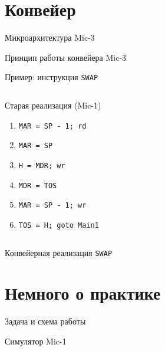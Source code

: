 \section{Конвейер}

\begin{frame}[plain]{Микроархитектура Mic-3}
\vspace{-.2cm}
\end{frame}

\begin{frame}[plain]{Принцип работы конвейера Mic-3}
\vspace{-.2cm}
\end{frame}

\begin{frame}{Пример: инструкция \texttt{SWAP}}
\pause
\begin{columns}
    \column{6cm}
\begin{block}{Старая реализация (Mic-1)}
\pause
    \begin{enumerate}
        \item \texttt{MAR = SP - 1; rd}
        \item \texttt{MAR = SP}
        \item \texttt{H = MDR; wr}
        \item \texttt{MDR = TOS}
        \item \texttt{MAR = SP - 1; wr}
        \item \texttt{TOS = H; goto Main1}
    \end{enumerate}
\end{block}
    \column{0cm}
\end{columns}
\end{frame}

\begin{frame}{Конвейерная реализация \texttt{SWAP}}
\end{frame}

\section{Немного о практике}

\begin{frame}{Задача и схема работы}
\end{frame}

\begin{frame}{Симулятор Mic-1}
\end{frame}


